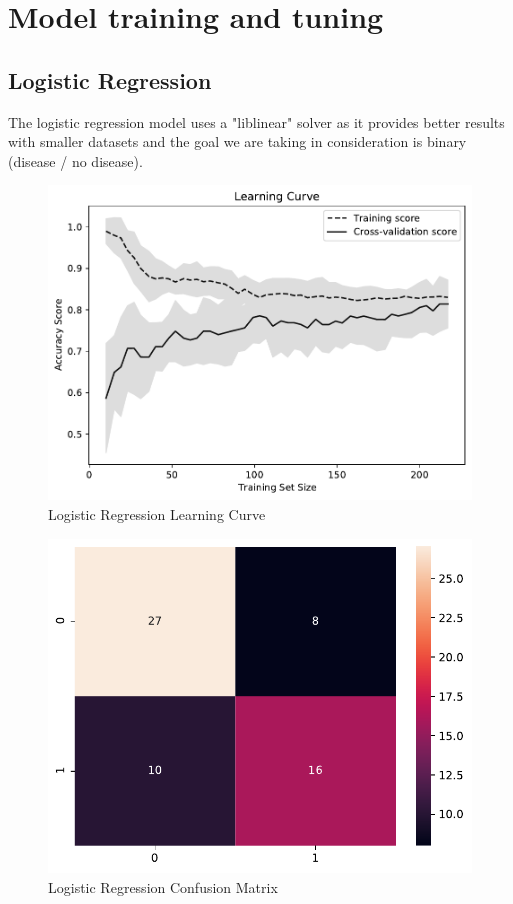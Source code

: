 \documentclass[conference]{IEEEtran}
\begin{document}
\section{Model training and tuning}

\subsection{Logistic Regression}
The logistic regression model uses a "liblinear" solver as it provides better results with smaller datasets and the goal we are taking in consideration is binary (disease / no disease).

\begin{figure}[H]
    \centerline{\includegraphics[width=0.9\linewidth]{images/LogisticRegression_lc.pdf}}
    \caption{Logistic Regression Learning Curve}
    \label{lr_lc}
\end{figure}

\noindent


\begin{figure}[H]
    \centerline{\includegraphics[width=0.8\linewidth]{images/log_reg_cm.pdf}}
    \caption{Logistic Regression Confusion Matrix}
    \label{lr_cm}
\end{figure}
\end{document}
